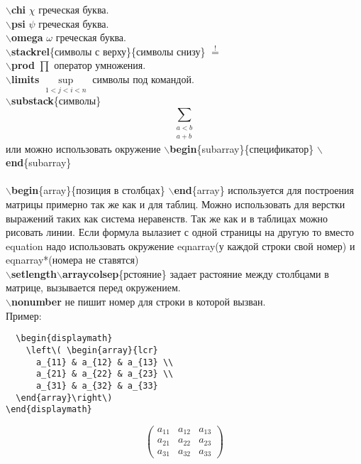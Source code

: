 \documentclass{article}
\newcommand{\bs}{$\backslash$}
\newcommand{\bd}[1]{{\bfseries #1}} %
\newcommand{\bb}[1]{\bd{\bs #1}} %
\begin{document}
\bb{chi} $\chi$ греческая буква.\\
\bb{psi} $\psi$ греческая буква.\\
\bb{omega} $\omega$ греческая буква.\\
\bb{stackrel}\{символы с верху\}\{символы снизу\} $\stackrel{!}{=}$\\
\bb{prod} $\prod$ оператор умножения.\\
\bb{limits} $\sup \limits_{1<j<i<n}$ символы под командой.\\
\bb{substack}\{символы\} \[\sum_{\substack{a<b \\ a+b}}\] или можно использовать
окружение \bb{begin}\{subarray\}\{спецификатор\} \bb{end}\{subarray\}\\ \\

\bb{begin}\{array\}\{позиция в столбцах\} \bb{end}\{array\} используется
для построения матрицы примерно так же как и для таблиц. Можно использовать
для верстки выражений таких как система неравенств. Так же как и в таблицах
можно рисовать линии. Если формула вылазиет с одной страницы на другую
то вместо equation надо использовать окружение
eqnarray(у каждой строки свой номер) и eqnarray*(номера не ставятся)\\
\bb{setlength}\bb{arraycolsep}\{рстояние\} задает растояние между столбцами в
матрице, вызывается перед окружением.\\
\bb{nonumber} не пишит номер для строки в которой вызван. \\
Пример:
\begin{verbatim}
  \begin{displaymath}
    \left\( \begin{array}{lcr}
      a_{11} & a_{12} & a_{13} \\
      a_{21} & a_{22} & a_{23} \\
      a_{31} & a_{32} & a_{33}
  \end{array}\right\)
\end{displaymath}
\end{verbatim}
\begin{displaymath}
  \left( \begin{array}{lcr}
    a_{11} & a_{12} & a_{13} \\
    a_{21} & a_{22} & a_{23} \\
    a_{31} & a_{32} & a_{33}
  \end{array}\right)
\end{displaymath}
\\\\
\end{document}
